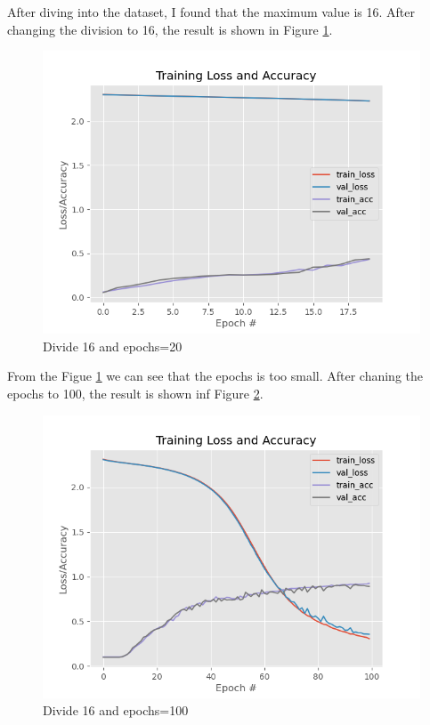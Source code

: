 After diving into the dataset, I found that the maximum value is 16.
After changing the division to 16, the result is shown in Figure \ref{fig:div16-epochs20}.

\begin{figure}[!ht]
  \centering
  \includegraphics[width=\textwidth]{pics/epochs20_div16}
  \caption{Divide 16 and epochs=20}
  \label{fig:div16-epochs20}
\end{figure}


From the Figue \ref{fig:div16-epochs20} we can see that the epochs is too small.
After chaning the epochs to 100, the result is shown inf Figure \ref{fig:div16-epochs100}.
\begin{figure}[!ht]
  \centering
  \includegraphics[width=\textwidth]{pics/epochs100_div16}
  \caption{Divide 16 and epochs=100}
  \label{fig:div16-epochs100}
\end{figure}
